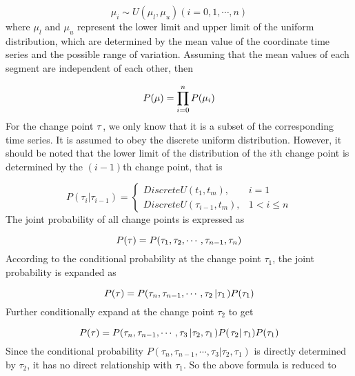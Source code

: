 \documentclass[journal]{IEEEtran}
\begin{document}
\begin{equation}\label{eq_bayesian_prior_mu}
{\mu _i} \sim U({\mu_l },{\mu_u })(i = 0,1, \cdots ,n)
\end{equation}
where $\mu_l$ and $\mu_u$ represent the lower limit and  upper limit of the uniform distribution, which are determined by the mean value of the coordinate time series and the possible range of variation. Assuming that the mean values of each segment are independent of each other, then

\begin{equation}\label{eq_bayesian_prior_mu_sum}
P({\bf{\mu }}) = \prod\limits_{i = 0}^n {P({\mu _i})}
\end{equation}
For the change point ${\bf{\tau }}$, we only know that it is a subset of the corresponding time series.
It is assumed to obey the discrete uniform distribution. However, it should be noted that the lower limit of the distribution of the $i$th change point is determined by the $(i-1)$th change point, that is

\begin{equation}\label{eq_bayesian_prior_tau_basic}
P({\tau _i}\left| {{\tau _{i - 1}}} \right.) = \left\{ {\begin{array}{*{20}{r}}
	{DiscreteU({t_1},{t_m}),}&{i = 1}\\
	{DiscreteU({\tau _{i - 1}},{t_m}),}&{1 < i \le n}
	\end{array}} \right.
\end{equation}
The joint probability of all change points is expressed as

\begin{equation}\label{eq_bayesian_prior_tau_1}
P({\bf{\tau }}) = P({\tau _1},{\tau _2}, \cdots ,{\tau _{n - 1}},{\tau _n})
\end{equation}
According to the conditional probability at the change point ${\tau _1}$, the joint probability is expanded as

\begin{equation}\label{eq_bayesian_prior_tau_2}
P({\bf{\tau }}) = P({\tau _n},{\tau _{n - 1}}, \cdots ,{\tau _2}\left| {{\tau _1}} \right.)P({\tau _1})
\end{equation}
Further conditionally expand at the change point ${\tau _2}$ to get

\begin{equation}\label{eq_bayesian_prior_tau_3}
P({\bf{\tau }}) = P({\tau _n},{\tau _{n - 1}}, \cdots ,{\tau _3}\left| {{\tau _2},{\tau _1}} \right.)P(\left. {{\tau _2}} \right|{\tau _1})P({\tau _1})
\end{equation}
Since the conditional probability $P({\tau _n},{\tau _{n - 1}}, \cdots ,{\tau _3}\left| {{\tau _2},{\tau _1}} \right.)$ is directly determined by ${\tau _2}$, it has no direct relationship with ${\tau _1}$. So the above formula is reduced to
\end{document}
